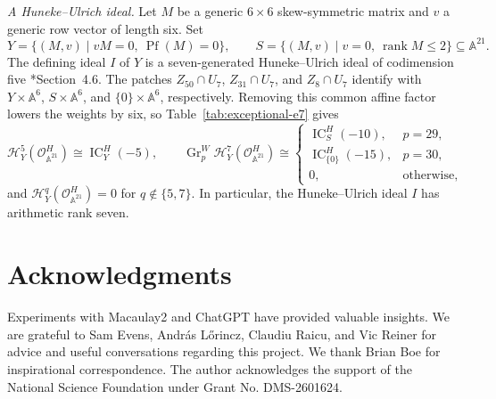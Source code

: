 \documentclass[12pt]{amsart}
\theoremstyle{definition}
\numberwithin{equation}{section}
\begin{document}
\smallskip
\noindent\textit{A Huneke--Ulrich ideal.}
Let $M$ be a generic $6\times6$ skew-symmetric matrix and $v$
a generic row vector of length six. Set
\[
 Y=\{(M,v)\mid vM=0,\ \operatorname{Pf}(M)=0\},\qquad
 S=\{(M,v)\mid v=0,\ \operatorname{rank}M\leq2\}
 \subseteq\mathbb A^{21}.
\]
The defining ideal $I$ of $Y$ is a seven-generated
Huneke--Ulrich ideal of codimension five
\cite{FTW}*{Section~4.6}.
The patches $Z_{50}\cap U_7$, $Z_{31}\cap U_7$, and $Z_8\cap U_7$
identify with $Y\times\mathbb A^6$, $S\times\mathbb A^6$,
and $\{0\}\times\mathbb A^6$, respectively.
Removing this common affine factor lowers the weights by six,
so Table~\ref{tab:exceptional-e7} gives
\[
 \mathscr H_Y^5(\mathcal O_{\mathbb A^{21}}^H)
 \cong\operatorname{IC}_Y^H(-5),
 \qquad
 \operatorname{Gr}_p^W
 \mathscr H_Y^7(\mathcal O_{\mathbb A^{21}}^H)
 \cong
 \begin{cases}
  \operatorname{IC}_S^H(-10),&p=29,\\
  \operatorname{IC}_{\{0\}}^H(-15),&p=30,\\
  0,&\text{otherwise},
 \end{cases}
\]
and $\mathscr H_Y^q(\mathcal O_{\mathbb A^{21}}^H)=0$
for $q\notin\{5,7\}$.
In particular, the Huneke--Ulrich ideal $I$ has arithmetic
rank seven.



\section*{Acknowledgments}
Experiments with Macaulay2 \cite{M2} and ChatGPT \cite{chat} have provided valuable insights.
 We are grateful to Sam Evens, Andr\'{a}s L\H{o}rincz, Claudiu Raicu, and Vic Reiner for advice and useful conversations regarding this project. We thank Brian Boe for inspirational correspondence. The author acknowledges the support of the National Science Foundation under Grant No. DMS-2601624.


 
\end{document}
